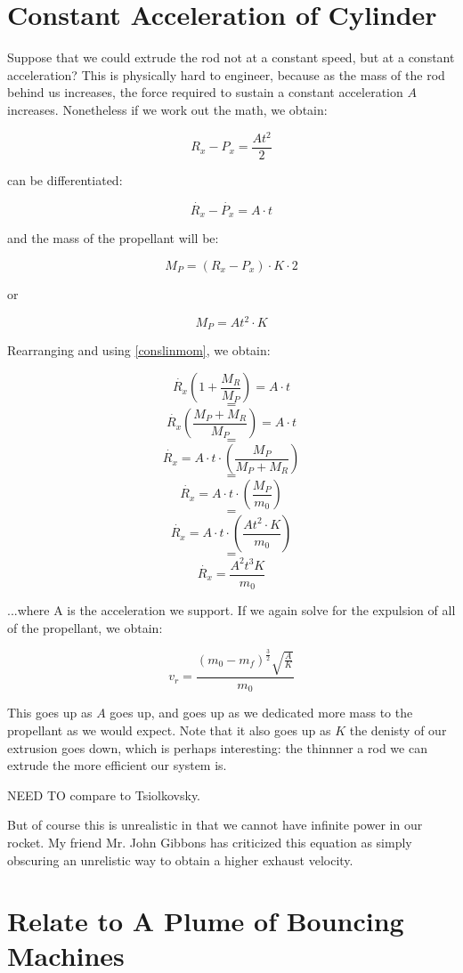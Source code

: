 \documentclass[11pt]{article}
\begin{document}
\section{Constant Acceleration of Cylinder}

Suppose that we could extrude the rod not at a constant speed, but
at a constant acceleration? This is physically hard to engineer,
because as the mass of the rod behind us increases, the force required
to sustain a constant acceleration $A$ increases. Nonetheless if we
work out the math, we obtain:

\[
\tag{Constant Acceleration} R_x - P_x  = \frac{A t^2}{2}
\]

\label{Constant Acceleration} can be differentiated:

\[
\tag{Velocities under C.A.} \dot{R_x} - \dot{P_x}  = A \cdot t
\]

and the mass of the propellant will be:

\[
 M_P = (R_x - P_x)\cdot K \cdot 2
\]

or

\[
 M_P = A t^2 \cdot K 
\]


Rearranging and using \eqref{conslinmom}, we obtain:

\[
\dot{R_x}(1 + \frac{M_R}{M_P} ) = A \cdot t
\]
\[
=
\]
\[
\dot{R_x}(\frac{M_P + M_R}{M_P} ) = A \cdot t
\]
\[
=
\]
\[
\dot{R_x} = A \cdot t \cdot (\frac{M_P}{M_P + M_R} )
\]
\[
=
\]
\[
\dot{R_x} = A \cdot t \cdot (\frac{M_P}{m_0} )
\]
\[
=
\]
\[
\dot{R_x} = A \cdot t \cdot (\frac{A t^2 \cdot K }{m_0} )
\]
\[
=
\]
\[
\dot{R_x} = \frac{A^2 t^3 K}{m_0}
\]

...where A is the acceleration we support. If we again solve for the
expulsion of all of the propellant, we obtain:

\[
v_r = \frac{(m_0 - m_f)^\frac{3}{2}\sqrt{\frac{A}{K}}}{m_0}
\]

This goes up as $A$ goes up, and goes up as we dedicated more mass to the propellant as we would expect.
Note that it also goes up as $K$ the denisty of our extrusion goes down, which is perhaps interesting:
the thinnner a rod we can extrude the more efficient our system is.

NEED TO compare to Tsiolkovsky.

But of course this is unrealistic in that we cannot have infinite power in our rocket.
My friend Mr. John Gibbons has criticized this equation as simply obscuring an unrelistic
way to obtain a higher exhaust velocity.

\section{Relate to A Plume of Bouncing Machines}
\end{document}
